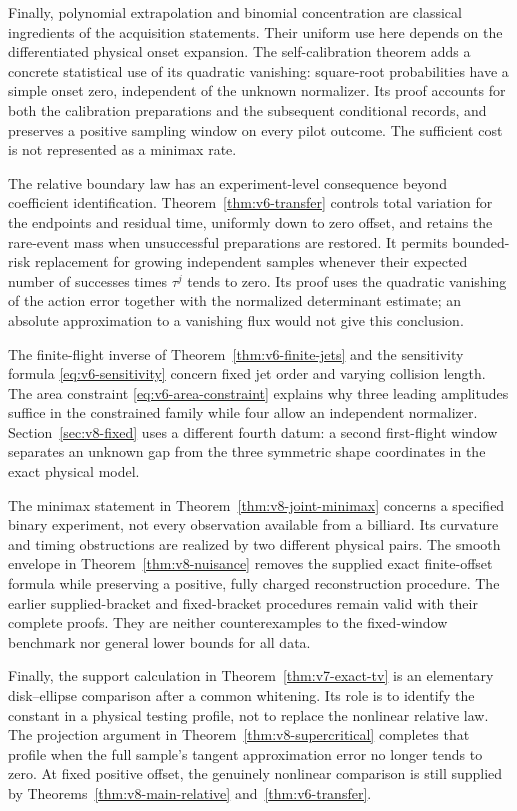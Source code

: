 Finally, polynomial extrapolation and binomial concentration are
classical ingredients of the acquisition statements. Their uniform use
here depends on the differentiated physical onset expansion. The
self-calibration theorem adds a concrete statistical use of its
quadratic vanishing: square-root probabilities have a simple onset
zero, independent of the unknown normalizer. Its proof accounts for
both the calibration preparations and the subsequent conditional
records, and preserves a positive sampling window on every pilot outcome.
The sufficient cost is not represented as a minimax rate.

The relative boundary law has an experiment-level consequence beyond
coefficient identification. Theorem~\ref{thm:v6-transfer} controls total
variation for the endpoints and residual time, uniformly down to zero
offset, and retains the rare-event mass when unsuccessful preparations
are restored. It permits bounded-risk replacement for growing independent
samples whenever their expected number of successes times $\tau^j$
tends to zero. Its proof uses the quadratic vanishing of the action
error together with the normalized determinant estimate; an absolute
approximation to a vanishing flux would not give this conclusion.

The finite-flight inverse of Theorem~\ref{thm:v6-finite-jets} and the
sensitivity formula \eqref{eq:v6-sensitivity} concern fixed jet order
and varying collision length. The area constraint
\eqref{eq:v6-area-constraint} explains why three leading amplitudes
suffice in the constrained family while four allow an independent
normalizer. Section~\ref{sec:v8-fixed} uses a different fourth datum:
a second first-flight window separates an unknown gap from the three
symmetric shape coordinates in the exact physical model.

The minimax statement in Theorem~\ref{thm:v8-joint-minimax} concerns a
specified binary experiment, not every observation available from a
billiard. Its curvature and timing obstructions are realized by two
different physical pairs. The smooth envelope in
Theorem~\ref{thm:v8-nuisance} removes the supplied exact finite-offset
formula while preserving a positive, fully charged reconstruction
procedure. The earlier supplied-bracket and fixed-bracket procedures
remain valid with their complete proofs. They are neither counterexamples
to the fixed-window benchmark nor general lower bounds for all data.

Finally, the support calculation in Theorem~\ref{thm:v7-exact-tv} is
an elementary disk--ellipse comparison after a common whitening.
Its role is to identify the constant in a physical testing profile,
not to replace the nonlinear relative law. The projection argument in
Theorem~\ref{thm:v8-supercritical} completes that profile when the full
sample's tangent approximation error no longer tends to zero. At fixed
positive offset, the genuinely nonlinear comparison is still supplied
by Theorems~\ref{thm:v8-main-relative} and~\ref{thm:v6-transfer}.

